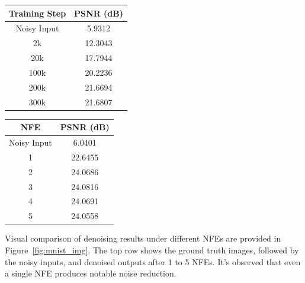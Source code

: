 \begin{minipage}[c]{0.48\linewidth}
  \centering
  \begin{tabular}{cc}
    \toprule
    \textbf{Training Step} & \textbf{PSNR (dB)} \\
    \midrule
    Noisy Input & 5.9312 \\
    2k & 12.3043 \\
    20k & 17.7944 \\
    100k & 20.2236 \\
    200k & 21.6694 \\
    300k & 21.6807 \\
    \bottomrule
  \end{tabular}
  \label{tab:psnr_over_step}
\end{minipage}
\hfill
\begin{minipage}[c]{0.48\linewidth}
  \centering
  \begin{tabular}{cc}
    \toprule
    \textbf{NFE} & \textbf{PSNR (dB)} \\
    \midrule
    Noisy Input & 6.0401 \\
    1 & 22.6455 \\
    2 & 24.0686 \\
    3 & 24.0816 \\
    4 & 24.0691 \\
    5 & 24.0558 \\
    \bottomrule
  \end{tabular}
  \label{tab:psnr_over_nfe}
\end{minipage}
\vspace{1cm}

Visual comparison of denoising results under different NFEs are provided in Figure~\ref{fig:mnist_img}. The top row shows the ground truth images, followed by the noisy inputs, and denoised outputs after 1 to 5 NFEs. It's observed that even a single NFE produces notable noise reduction.

